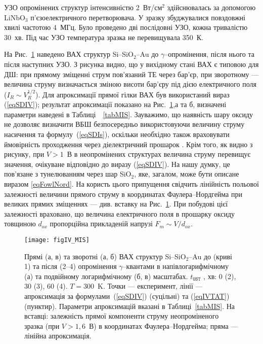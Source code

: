 УЗО опромінених структур інтенсивністю 2~Вт/см$^2$ здійснювалась за допомогою LiNbO$_3$ п'єзоелектричного перетворювача.
У зразку збуджувалися повздовжні хвилі частотою 4~МГц.
Було проведено дві послідовні УЗО, кожна тривалістю 30~хв.
Під час УЗО температура зразка не перевищувала 350~К.

На Рис.~\ref{figIV_MIS} наведено ВАХ структур  Si--SiO$_2$--Au до $\gamma$--опромінення, після нього та після наступних УЗО.
З рисунка видно, що у вихідному стані ВАХ є типовою для ДШ:
при прямому зміщенні струм пов'язаний ТЕ через бар'єр,
при зворотному --- величина струму визначається зміною висоти бар'єру під дією електричного поля ($I_R\sim V_R^{1/2}$).
Для апроксимації прямої гілки ВАХ був використаний вираз (\ref{eqSDIV});
результат апроксимації показано на Рис.~\ref{figIV_MIS},а та б, визначені параметри
наведені в Таблиці~~\ref{tabMIS}.
Зауважимо, що наявність шару оксиду не дозволяє визначити ВБШ безпосередньо використовуючи величину струму насичення та формулу~(\ref{eqSDIs}), оскільки необхідно також враховувати ймовірність проходження через діелектричний прошарок \cite{OZBEK2011,Kobayashi}.
Крім того, як видно з рисунку, при $V>1$~В в неопромінених структурах величина струму перевищує значення, очікуване відповідно до виразу (\ref{eqSDIV}).
На нашу думку, це пов'язане з тунелюванням через шар SiO$_2$, яке, загалом, може бути описане виразом \ref{eqFowlNord}.
На користь цього припущення свідчить лінійність польової залежності величини прямого струму в координатах Фаулера--Нордгейма при великих прямих зміщеннях --- див. вставку на Рис.~\ref{figIV_MIS}.
При побудові цієї залежності враховано, що величина електричного поля в прошарку оксиду товщиною $d_{ox}$ пропорційна прикладеній напрузі $F_m\sim V/d_{ox}$.

\begin{figure}
\center
\texttt{[image: figIV\_MIS]}%
\caption{\label{figIV_MIS}
Прямі (а, в) та зворотні (а, б) ВАХ структур Si--SiO$_2$--Au до (криві 1)
та після (2--4) опромінення $\gamma$--квантами в напівлогарифмічному (а)
та подвійному логарифмічному (б, в) масштабах.
$t_\mathtt{UST}$ , хв: 0 (2), 30 (3), 60 (4).
$T=300$~K.
Точки --- експеримент,
лінії --- апроксимація за формулами~(\ref{eqSDIV}) (суцільні) та (\ref{eqIVTAT}) (пунктир).
Параметри апроксимацій вказані в Таблиці~\ref{tabMIS}.
На вставці:
залежність прямої компоненти струму неопроміненого зразка (при $V>1,6$~В) в координатах Фаулера--Нордгейма;
пряма --- лінійна апроксимація.
}%
\end{figure}





